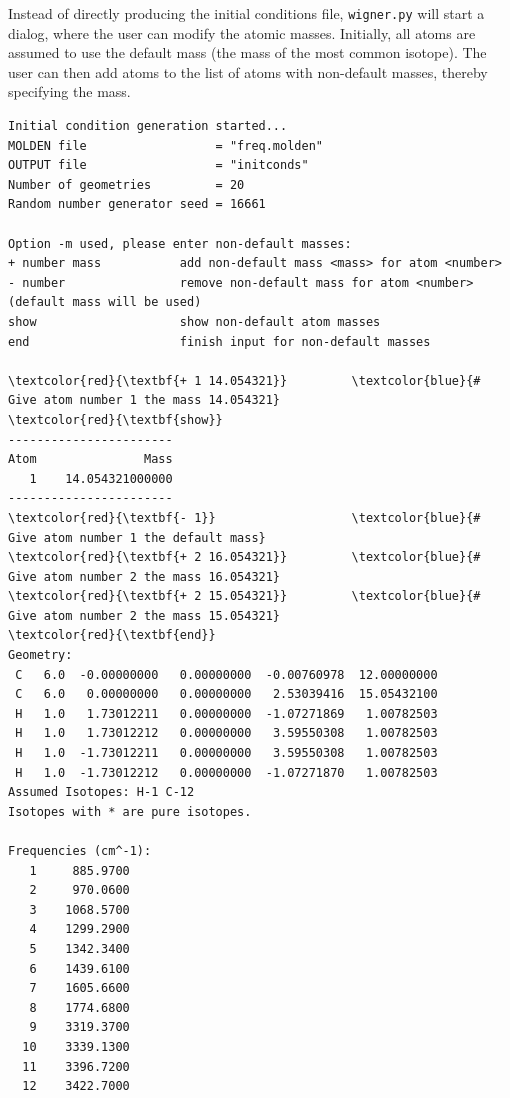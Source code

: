 \documentclass[a4paper,11pt,DIV=15,openany]{scrbook}
\newcommand{\ttt}[1]{\texttt{#1}}
\begin{document}
Instead of directly producing the initial conditions file, \ttt{wigner.py} will start a dialog, where the user can modify the atomic masses. Initially, all atoms are assumed to use the default mass (the mass of the most common isotope). The user can then add atoms to the list of atoms with non-default masses, thereby specifying the mass. 
\begin{oframed}
\footnotesize\begin{Verbatim}[commandchars=\\\{\}]
Initial condition generation started...
MOLDEN file                  = "freq.molden"
OUTPUT file                  = "initconds"
Number of geometries         = 20
Random number generator seed = 16661

Option -m used, please enter non-default masses:
+ number mass           add non-default mass <mass> for atom <number>
- number                remove non-default mass for atom <number> (default mass will be used)
show                    show non-default atom masses
end                     finish input for non-default masses

\textcolor{red}{\textbf{+ 1 14.054321}}         \textcolor{blue}{# Give atom number 1 the mass 14.054321}
\textcolor{red}{\textbf{show}}
-----------------------
Atom               Mass
   1    14.054321000000
-----------------------
\textcolor{red}{\textbf{- 1}}                   \textcolor{blue}{# Give atom number 1 the default mass}
\textcolor{red}{\textbf{+ 2 16.054321}}         \textcolor{blue}{# Give atom number 2 the mass 16.054321}
\textcolor{red}{\textbf{+ 2 15.054321}}         \textcolor{blue}{# Give atom number 2 the mass 15.054321}
\textcolor{red}{\textbf{end}}
Geometry:
 C   6.0  -0.00000000   0.00000000  -0.00760978  12.00000000 
 C   6.0   0.00000000   0.00000000   2.53039416  15.05432100 
 H   1.0   1.73012211   0.00000000  -1.07271869   1.00782503 
 H   1.0   1.73012212   0.00000000   3.59550308   1.00782503 
 H   1.0  -1.73012211   0.00000000   3.59550308   1.00782503 
 H   1.0  -1.73012212   0.00000000  -1.07271870   1.00782503 
Assumed Isotopes: H-1 C-12 
Isotopes with * are pure isotopes.

Frequencies (cm^-1):
   1     885.9700
   2     970.0600
   3    1068.5700
   4    1299.2900
   5    1342.3400
   6    1439.6100
   7    1605.6600
   8    1774.6800
   9    3319.3700
  10    3339.1300
  11    3396.7200
  12    3422.7000

\end{Verbatim}
\end{oframed}
\end{document}
